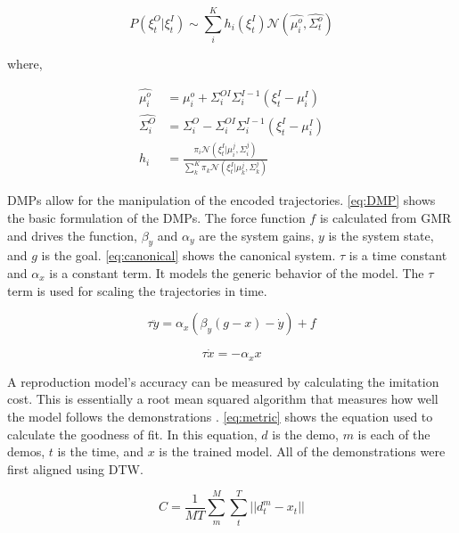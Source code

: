 \begin{equation} 
     P(\xi_t^O | \xi_t^I ) \sim \sum_i^K h_i(\xi_t^I) \mathcal{N}( \hat{\mu_i^o}, \hat{\Sigma_t^o}) 
     \label{eq:GMR_Prop} 
\end{equation} 

where, 

\begin{equation} 
    \begin{aligned} 
      \hat{\mu_i^o} &= \mu_i^o + \Sigma_i^{OI}\Sigma_i^{I-1}(\xi_t^I - \mu_i^I)\\ 
      \hat{\Sigma_i^O} &= \Sigma_i^O - \Sigma_i^{OI}\Sigma_i^{I-1}(\xi_t^I - \mu_i^I) \\ 
       h_{i} &= \frac{\pi_i \mathcal{N}(\xi_t^I | \mu_i^j , \Sigma_i^j )}{ \sum_k^K \pi_k \mathcal{N}(\xi_t^I | \mu_k^j , \Sigma_k^j ) }   
    \end{aligned} 
    \label{eq:GMR_mu} 
\end{equation} 

DMPs allow for the manipulation of the encoded trajectories. \autoref{eq:DMP} shows the basic formulation of the DMPs. The force function $f$ is calculated from GMR and drives the function, $\beta_y$ and $\alpha_y$ are the system gains, $y$ is the system state, and $g$ is the goal. \autoref{eq:canonical} shows the canonical system. $\tau$ is a time constant and $\alpha_x$ is a constant term. It models the generic behavior of the model. The $\tau$ term is used for scaling the trajectories in time.  


\begin{equation}
    \tau \ddot{y} = \alpha_x (\beta_y(g-x)-\dot{y}) + f  
    \label{eq:DMP} 
\end{equation}


\begin{equation}
    \tau \dot{x} = -\alpha_x x  
    \label{eq:canonical} 
\end{equation}



A reproduction model's accuracy can be measured by calculating the imitation cost. This is essentially a root mean squared algorithm that measures how well the model follows the demonstrations \cite{metric}. \autoref{eq:metric} shows the equation used to calculate the goodness of fit. In this equation, $d$ is the demo, $m$ is each of the demos, $t$ is the time, and $x$ is the trained model. All of the demonstrations were first aligned using DTW.

   \begin{equation}
        C = \frac{1}{MT} \sum_m^M{\sum_t^T{ || d^m_t - x_t||}}
        \label{eq:metric}
    \end{equation}


